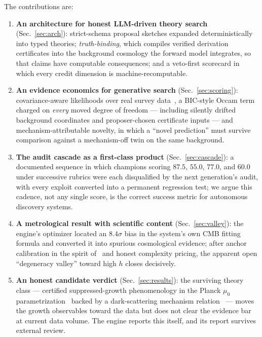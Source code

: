 \documentclass[journal]{IEEEtran}
\begin{document}
The contributions are:
\begin{enumerate}
  \item \textbf{An architecture for honest LLM-driven theory search}
  (Sec.~\ref{sec:arch}): strict-schema proposal sketches expanded deterministically into
  typed theories; \emph{truth-binding}, which compiles verified derivation certificates
  into the background cosmology the forward model integrates, so that claims have
  computable consequences; and a veto-first scorecard in which every credit dimension is
  machine-recomputable.
  \item \textbf{An evidence economics for generative search}
  (Sec.~\ref{sec:scoring}): covariance-aware likelihoods over real survey
  data~\cite{chen2019,desi2024}, a BIC-style Occam term~\cite{schwarz1978,burnham2004}
  charged on \emph{every} moved degree of freedom --- including silently drifted
  background coordinates and proposer-chosen certificate inputs --- and
  mechanism-attributable novelty, in which a ``novel prediction'' must survive comparison
  against a mechanism-off twin on the same background.
  \item \textbf{The audit cascade as a first-class product}
  (Sec.~\ref{sec:cascade}): a documented sequence in which champions scoring
  $87.5$, $55.0$, $77.0$, and $60.0$ under successive rubrics were each disqualified by
  the next generation's audit, with every exploit converted into a permanent regression
  test; we argue this cadence, not any single score, is the correct success metric for
  autonomous discovery systems.
  \item \textbf{A metrological result with scientific content}
  (Sec.~\ref{sec:valley}): the engine's optimizer located an $8.4\sigma$ bias in the
  system's own CMB fitting formula and converted it into spurious cosmological evidence;
  after anchor calibration in the spirit of~\cite{aubourg2015} and honest complexity
  pricing, the apparent open ``degeneracy valley'' toward high $h$ closes decisively.
  \item \textbf{An honest candidate verdict} (Sec.~\ref{sec:results}): the surviving
  theory class --- certified suppressed-growth phenomenology in the Planck
  $\mu_0$ parametrization~\cite{planckmg2015} backed by a dark-scattering mechanism
  relation~\cite{simpson2010,pourtsidou2013} --- moves the growth observables toward the
  data but does not clear the evidence bar at current data volume. The engine reports
  this itself, and its report survives external review.
\end{enumerate}
\end{document}
